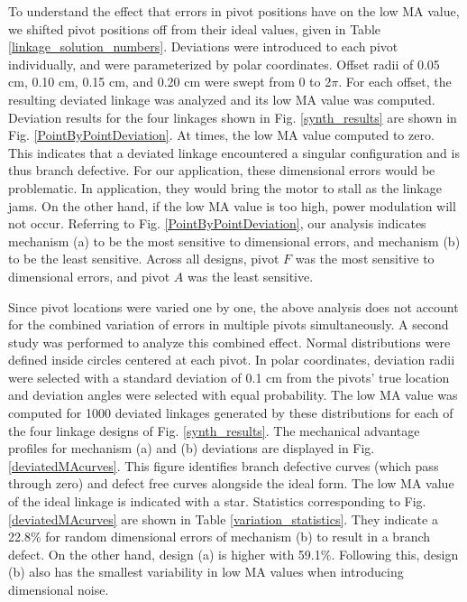 \documentclass[journal]{IEEEtran}
\begin{document}
To understand the effect that errors in pivot positions have on the low MA value, we shifted pivot positions off from their ideal values, given in Table \ref{linkage_solution_numbers}.
Deviations were introduced to each pivot individually, and were parameterized by polar coordinates.
Offset radii of 0.05 cm, 0.10 cm, 0.15 cm, and 0.20 cm were swept from 0 to 2$\pi$.
For each offset, the resulting deviated linkage was analyzed and its low MA value was computed.
Deviation results for the four linkages shown in Fig. \ref{synth_results} are shown in Fig. \ref{PointByPointDeviation}.
At times, the low MA value computed to zero.
This indicates that a deviated linkage encountered a singular configuration and is thus branch defective.
For our application, these dimensional errors would be problematic.
In application, they would bring the motor to stall as the linkage jams.
On the other hand, if the low MA value is too high, power modulation will not occur.
Referring to Fig. \ref{PointByPointDeviation}, our analysis indicates mechanism (a) to be the most sensitive to dimensional errors, and mechanism (b) to be the least sensitive.
Across all designs, pivot $F$ was the most sensitive to dimensional errors, and pivot $A$ was the least sensitive.


Since pivot locations were varied one by one, the above analysis does not account for the combined variation of errors in multiple pivots simultaneously.
A second study was performed to analyze this combined effect.
Normal distributions were defined inside circles centered at each pivot.
In polar coordinates, deviation radii were selected with a standard deviation of 0.1 cm from the pivots' true location and deviation angles were selected with equal probability.
The low MA value was computed for 1000 deviated linkages generated by these distributions for each of the four linkage designs of Fig. \ref{synth_results}.
The mechanical advantage profiles for mechanism (a) and (b) deviations are displayed in Fig. \ref{deviatedMAcurves}.
This figure identifies branch defective curves (which pass through zero) and defect free curves alongside the ideal form.
The low MA value of the ideal linkage is indicated with a star.
Statistics corresponding to Fig. \ref{deviatedMAcurves} are shown in Table \ref{variation_statistics}.
They indicate a 22.8\% for random dimensional errors of mechanism (b) to result in a branch defect.  On the other hand, design (a) is higher with 59.1\%.
Following this, design (b) also has the smallest variability in low MA values when introducing dimensional noise.
\end{document}
